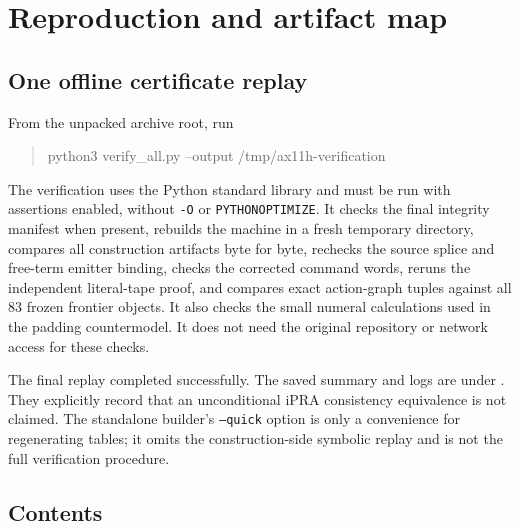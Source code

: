 \documentclass[11pt,a4paper]{article}
\begin{document}






\section{Reproduction and artifact map}
\label{sec:reproduce}

\subsection{One offline certificate replay}

From the unpacked archive root, run
\begin{quote}\small\ttfamily
python3 verify\_all.py --output /tmp/ax11h-verification
\end{quote}
The verification uses the Python standard library and must be run with
assertions enabled, without \texttt{-O} or \texttt{PYTHONOPTIMIZE}.
It checks the final integrity manifest when present, rebuilds the machine
in a fresh temporary directory, compares all construction artifacts byte
for byte, rechecks the source splice and free-term emitter binding, checks
the corrected command words, reruns the independent literal-tape proof,
and compares exact action-graph tuples against all 83 frozen frontier
objects. It also checks the small numeral calculations used in the
padding countermodel. It does not need the original repository or network
access for these checks.

The final replay completed successfully. The saved summary and logs are
under . They explicitly record that an
unconditional iPRA consistency equivalence is not claimed. The standalone
builder's \texttt{--quick} option is only a convenience for regenerating
tables; it omits the construction-side symbolic replay and is not the
full verification procedure.

\subsection{Contents}
\end{document}
